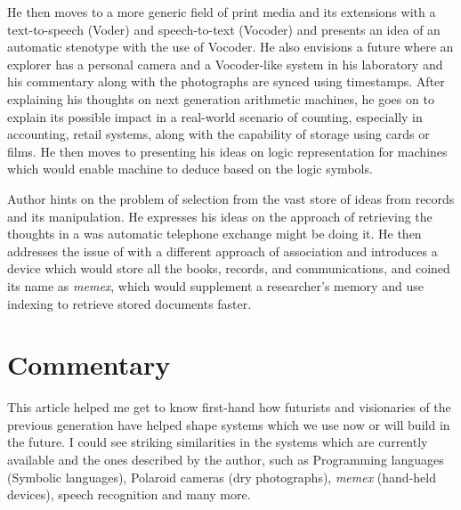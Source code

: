 \documentclass[a4paper, 11pt]{article}
\begin{document}
He then moves to a more generic field of print media and its extensions with a text-to-speech (Voder) and speech-to-text (Vocoder) and presents an idea of an automatic stenotype with the use of Vocoder. He also envisions a future where an explorer has a personal camera and a Vocoder-like system in his laboratory and his commentary along with the photographs are synced using timestamps. After explaining his thoughts on next generation arithmetic machines, he goes on to explain its possible impact in a real-world scenario of counting, especially in accounting, retail systems, along with the capability of storage using cards or films. He then moves to presenting his ideas on logic representation for machines which would enable machine to deduce based on the logic symbols. 

Author hints on the problem of selection from the vast store of ideas from records and its manipulation. He expresses his ideas on the approach of retrieving the thoughts in a was automatic telephone exchange might be doing it. He then addresses the issue of with a different approach of association and introduces a device which would store all the books, records, and communications, and coined its name as \textit{memex}, which would supplement a researcher's memory and use indexing to retrieve stored documents faster. 

\vspace{-10pt}
\section*{Commentary}
\vspace{-5pt}
This article helped me get to know first-hand how futurists and visionaries of the previous generation have helped shape systems which we use now or will build in the future. I could see striking similarities in the systems which are currently available and the ones described by the author, such as Programming languages (Symbolic languages), Polaroid cameras (dry photographs), \textit{memex} (hand-held devices), speech recognition and many more.
\end{document}
